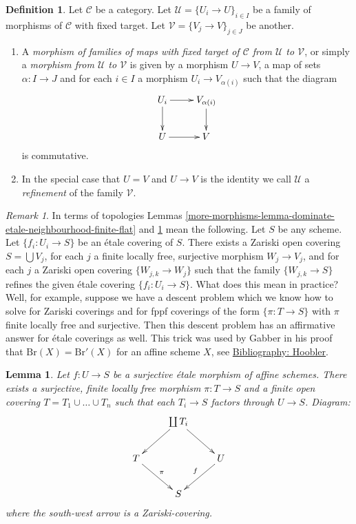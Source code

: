\documentclass{amsart}
\theoremstyle{plain}
\newtheorem{lemma}[subsection]{Lemma}
\theoremstyle{definition}
\newtheorem{definition}[subsection]{Definition}
\theoremstyle{remark}
\newtheorem{remark}[subsection]{Remark}
\numberwithin{equation}{subsection}
\begin{document}
\begin{definition}
\label{sites-definition-morphism-coverings}
Let $\mathcal{C}$ be a category.
Let $\mathcal{U} = \{U_i \to U\}_{i\in I}$ be a family
of morphisms of $\mathcal{C}$ with fixed target.
Let $\mathcal{V} = \{V_j \to V\}_{j\in J}$ be another.
\begin{enumerate}
\item
A {\it morphism of families of maps with fixed target
of $\mathcal{C}$ from  $\mathcal{U}$ to $\mathcal{V}$},
or simply a {\it morphism from $\mathcal{U}$ to $\mathcal{V}$}
is given by a morphism $U \to V$, a map of sets
$\alpha : I \to J$ and for each $i\in I$
a morphism $U_i \to V_{\alpha(i)}$ such that the diagram
$$
\xymatrix{
U_i \ar[r] \ar[d]
&
V_{\alpha(i)} \ar[d]
\\
U \ar[r]
&
V
}
$$
is commutative.
\item In the special case that $U = V$ and $U \to V$ is the identity
we call $\mathcal{U}$ a {\it refinement} of the family $\mathcal{V}$.
\end{enumerate}
\end{definition}

\begin{remark}
\label{more-morphisms-remark-topologies}
In terms of topologies
Lemmas \ref{more-morphisms-lemma-dominate-etale-neighbourhood-finite-flat} and
\ref{more-morphisms-lemma-dominate-etale-affine-finite-flat} mean the following.
Let $S$ be any scheme. Let $\{f_i : U_i \to S\}$ be an \'etale covering
of $S$. There exists a Zariski open covering $S = \bigcup V_j$,
for each $j$ a finite locally free, surjective morphism
$W_j \to V_j$, and for each $j$ a Zariski open covering
$\{W_{j, k} \to W_j\}$ such that the family
$\{W_{j, k} \to S\}$ refines the given \'etale covering
$\{f_i : U_i \to S\}$. What does this mean in practice?
Well, for example, suppose we have a descent problem which we
know how to solve for Zariski coverings and for fppf coverings
of the form $\{\pi : T \to S\}$ with $\pi$ finite locally free
and surjective. Then this descent problem has an affirmative
answer for \'etale coverings as well. This trick was used by
Gabber in his proof that $\text{Br}(X) = \text{Br}'(X)$
for an affine scheme $X$, see \href{https://stacks.math.columbia.edu/bibliography}{Bibliography: Hoobler}.
\end{remark}

\begin{lemma}
\label{more-morphisms-lemma-dominate-etale-affine-finite-flat}
Let $f : U \to S$ be a surjective \'etale morphism of affine schemes.
There exists a surjective, finite locally free morphism
$\pi : T \to S$ and a finite open covering
$T = T_1 \cup \ldots \cup T_n$ such that each
$T_i \to S$ factors through $U \to S$. Diagram:
$$
\xymatrix{
& \coprod T_i  \ar[rd] \ar[ld] & \\
T \ar[rd]^\pi & & U \ar[ld]_f \\
& S &
}
$$
where the south-west arrow is a Zariski-covering.
\end{lemma}
\end{document}
